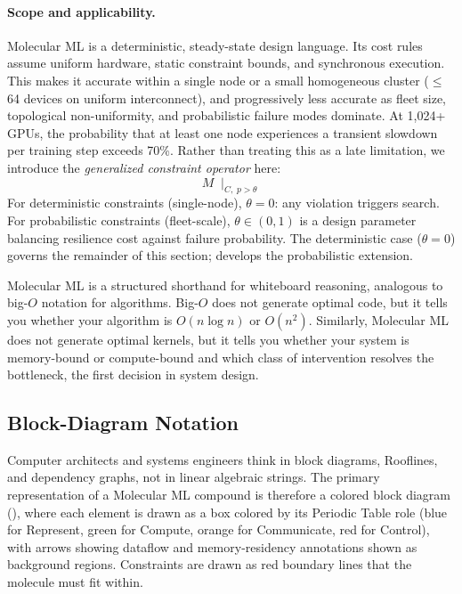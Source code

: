 \documentclass[10pt,twocolumn]{article}
\begin{document}
\paragraph{Scope and applicability.} Molecular ML is a deterministic, steady-state design language. Its cost rules assume uniform hardware, static constraint bounds, and synchronous execution. This makes it accurate within a single node or a small homogeneous cluster ($\leq$64 devices on uniform interconnect), and progressively less accurate as fleet size, topological non-uniformity, and probabilistic failure modes dominate. At 1,024+ GPUs, the probability that at least one node experiences a transient slowdown per training step exceeds 70\%. Rather than treating this as a late limitation, we introduce the \emph{generalized constraint operator} here:
\begin{equation}
\label{eq:gen-constraint}
M \;\mid_{C,\; p > \theta}
\end{equation}
For deterministic constraints (single-node), $\theta = 0$: any violation triggers search. For probabilistic constraints (fleet-scale), $\theta \in (0, 1)$ is a design parameter balancing resilience cost against failure probability. The deterministic case ($\theta = 0$) governs the remainder of this section;  develops the probabilistic extension.

Molecular ML is a structured shorthand for whiteboard reasoning, analogous to big-$O$ notation for algorithms. Big-$O$ does not generate optimal code, but it tells you whether your algorithm is $O(n \log n)$ or $O(n^2)$. Similarly, Molecular ML does not generate optimal kernels, but it tells you whether your system is memory-bound or compute-bound and which class of intervention resolves the bottleneck, the first decision in system design.

\subsection{Block-Diagram Notation}
\label{sec:visual}

Computer architects and systems engineers think in block diagrams, Rooflines, and dependency graphs, not in linear algebraic strings. The primary representation of a Molecular ML compound is therefore a colored block diagram (), where each element is drawn as a box colored by its Periodic Table role (blue for Represent, green for Compute, orange for Communicate, red for Control), with arrows showing dataflow and memory-residency annotations shown as background regions. Constraints are drawn as red boundary lines that the molecule must fit within.
\end{document}
